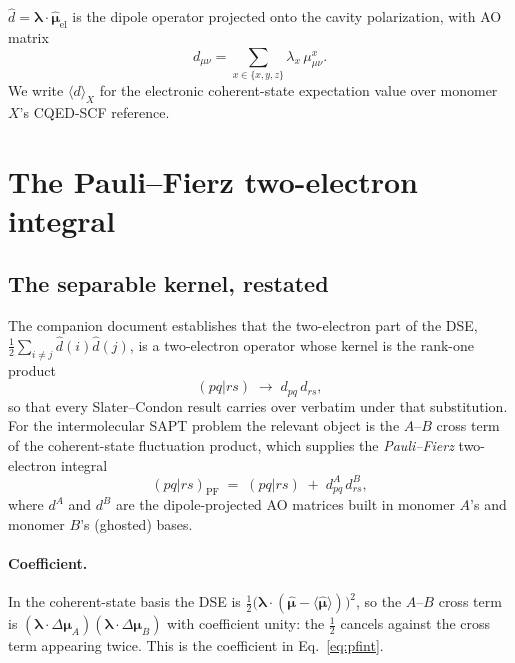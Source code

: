 \documentclass[11pt]{article}
\newcommand{\lam}{\bm{\lambda}}
\newcommand{\dop}{\hat{d}}                      %
\newcommand{\dexp}{\langle d \rangle}
\begin{document}
\noindent
$\dop = \lam\cdot\hat{\bm{\mu}}_{\mathrm{el}}$ is the dipole operator projected
onto the cavity polarization, with AO matrix
\begin{equation}
d_{\mu\nu} = \sum_{x \in \{x,y,z\}} \lambda_x \, \mu^{x}_{\mu\nu} .
\label{eq:dao}
\end{equation}
We write $\dexp_X$ for the electronic coherent-state expectation value over
monomer $X$'s CQED-SCF reference.

\section{The Pauli--Fierz two-electron integral}
\label{sec:pf}

\subsection{The separable kernel, restated}

The companion document establishes that the two-electron part of the DSE,
$\tfrac{1}{2}\sum_{i\neq j}\dop(i)\dop(j)$, is a two-electron operator whose
kernel is the rank-one product
\begin{equation}
(pq|rs) \;\longrightarrow\; d_{pq}\, d_{rs} ,
\label{eq:sepkernel}
\end{equation}
so that every Slater--Condon result carries over verbatim under that
substitution. For the intermolecular SAPT problem the relevant object is the
$A$--$B$ cross term of the coherent-state fluctuation product, which supplies
the \emph{Pauli--Fierz} two-electron integral
\begin{equation}
(pq|rs)_{\mathrm{PF}} \;=\; (pq|rs) \;+\; d^{A}_{pq}\, d^{B}_{rs} ,
\label{eq:pfint}
\end{equation}
where $d^{A}$ and $d^{B}$ are the dipole-projected AO matrices built in
monomer $A$'s and monomer $B$'s (ghosted) bases.

\paragraph{Coefficient.} In the coherent-state basis the DSE is
$\tfrac{1}{2}\bigl(\lam\cdot(\hat{\bm\mu}-\langle\hat{\bm\mu}\rangle)\bigr)^2$,
so the $A$--$B$ cross term is
$(\lam\cdot\Delta\bm{\mu}_A)(\lam\cdot\Delta\bm{\mu}_B)$ with coefficient
unity: the $\tfrac12$ cancels against the cross term appearing twice. This is
the coefficient in Eq.~\eqref{eq:pfint}.
\end{document}
